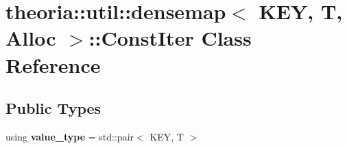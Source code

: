 \hypertarget{classtheoria_1_1util_1_1densemap_1_1ConstIter}{\section{theoria\+:\+:util\+:\+:densemap$<$ K\+E\+Y, T, Alloc $>$\+:\+:Const\+Iter Class Reference}
\label{classtheoria_1_1util_1_1densemap_1_1ConstIter}
}
\subsection*{Public Types}
\begin{DoxyCompactItemize}
\item 
\hypertarget{classtheoria_1_1util_1_1densemap_1_1ConstIter_a061fb76ecf5498d6033472fa66635d4a}{using {\bfseries value\+\_\+type} = std\+::pair$<$ K\+E\+Y, T $>$}\label{classtheoria_1_1util_1_1densemap_1_1ConstIter_a061fb76ecf5498d6033472fa66635d4a}

\end{DoxyCompactItemize}
